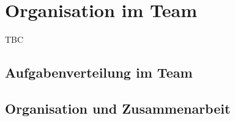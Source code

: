 \chapter{Organisation im Team}

TBC

\section{Aufgabenverteilung im Team}

\section{Organisation und Zusammenarbeit}